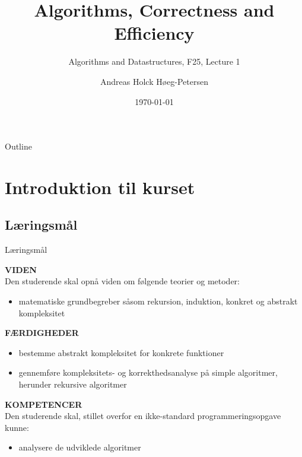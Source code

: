 \documentclass[aspectratio=1610]{beamer}
\title[ALG25 - Lecture 1]
{Algorithms, Correctness and Efficiency}
\subtitle
{Algorithms and Datastructures, F25, Lecture 1}
\author[Andreas H. Høeg-Petersen]
{Andreas Holck Høeg-Petersen}
\institute[AAU]{%
  Department of Computer Science\\
  Aalborg University
}
\date {\today}
\begin{document}
\begin{frame}
  \titlepage
\end{frame}

\begin{frame}{Outline}
  \tableofcontents
\end{frame}


\section{Introduktion til kurset}

\subsection[Læringsmål]{Læringsmål}

\begin{frame}{Læringsmål}

    \textbf{VIDEN} \\
    Den studerende skal opnå viden om følgende teorier og metoder:

    \begin{itemize}
        \item \alert{matematiske grundbegreber} såsom rekursion, induktion,
            \alert{konkret og abstrakt kompleksitet}
    \end{itemize}

    \medskip
    \textbf{FÆRDIGHEDER} \\

    \begin{itemize}
        \item \alert{bestemme abstrakt kompleksitet for konkrete funktioner}
        \item \alert{gennemføre kompleksitets-} og korrektheds\alert{analyse på
            simple algoritmer}, herunder rekursive algoritmer
    \end{itemize}

    \medskip
    \textbf{KOMPETENCER} \\
    Den studerende skal, stillet overfor en ikke-standard programmeringsopgave kunne:

    \begin{itemize}
        \item \alert{analysere de udviklede algoritmer}
    \end{itemize}
    
\end{frame}
\end{document}

